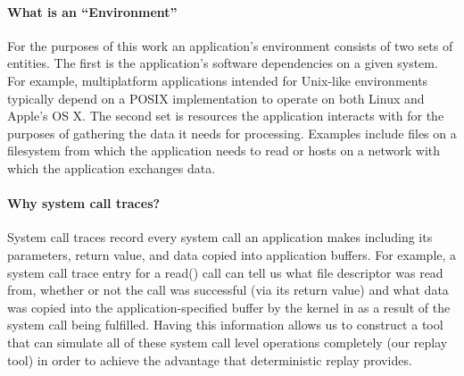 
\paragraph{What is an ``Environment''}

For the purposes of this work an application's environment consists of two sets of entities.  The first is the
application's software dependencies on a given system.  For example, multiplatform applications intended for Unix-like
environments typically depend on a POSIX implementation to operate on both Linux and Apple's OS X.  The second set is
resources the application interacts with for the purposes of gathering the data it needs for processing.  Examples
include files on a filesystem from which the application needs to read or hosts on a network with which the application
exchanges data.


\paragraph{Why system call traces?}

System call traces record every system call an application makes including its parameters, return value, and data copied
into application buffers.  For example, a system call trace entry for a read() call can tell us what file descriptor was
read from, whether or not the call was successful (via its return value) and what data was copied into the
application-specified buffer by the kernel in as a result of the system call being fulfilled.  Having this information
allows us to construct a tool that can simulate all of these system call level operations completely (our replay tool)
in order to achieve the advantage that deterministic replay provides.
